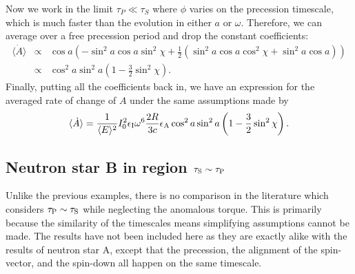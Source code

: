 \documentclass[../full_thesis/full_thesis.tex]{subfiles}
\begin{document}
Now we work in the limit $\tau_P \ll \tau_S$ where $\phi$ varies on the
precession timescale, which is much faster than the evolution in either $a$ or $\omega$.
Therefore, we can average over a free precession period and drop the constant
coefficients:
\begin{align}
\langle\dot{A}\rangle &\propto& \cos a \left(-\sin^{2}a\cos a \sin^{2}\chi +
       \frac{1}{2}\left(\sin^{2}a\cos a \cos^{2}\chi +
       \sin^{2}a \cos a \right) \right) \\
& \propto& \cos^{2} a \sin^{2}a\left(1-\frac{3}{2}\sin^{2}\chi\right).
\end{align}
Finally, putting all the coefficients back in, we have an expression for the averaged
rate of change of $A$ under the same assumptions made by \citet{Goldreich1970}
\begin{equation}
\langle \dot{A} \rangle =\frac{1}{\langle E\rangle ^{2}}I_{0}^{2}
                         \epsilon_{\mathrm{I}}\omega^{6}\frac{2R}{3c}\epsilon_{\mathrm{A}}
                         \cos^{2} a \sin^{2}a
                         \left(1-\frac{3}{2}\sin^{2}\chi\right).
\label{eqn: A dot}
\end{equation}


\subsection{Neutron star B in region \texorpdfstring{$\tau_{\mathrm{S}}\sim \tau_{\mathrm{P}}$}{}}
\label{sec: B_NA}
Unlike the previous examples, there is no comparison in the literature which
considers $\tau_{\mathrm{P}}\sim\tau_{\mathrm{S}}$ while neglecting the anomalous torque. This is
primarily because the similarity of the timescales means simplifying
assumptions cannot be made. The results have not been included here as they are
exactly alike with the results of neutron star A, except that the
precession, the alignment of the spin-vector, and the
spin-down all happen on the same timescale.
\end{document}
